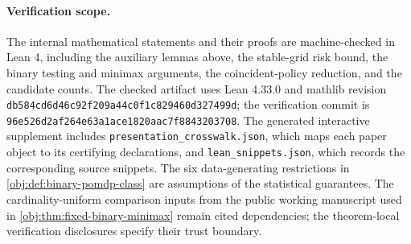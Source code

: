 \paragraph{Verification scope.}
The internal mathematical statements and their proofs are machine-checked in Lean 4, including the auxiliary lemmas above, the stable-grid risk bound, the binary testing and minimax arguments, the coincident-policy reduction, and the candidate counts. The checked artifact uses Lean 4.33.0 and mathlib revision \texttt{db584cd6d46c92f2}\allowbreak\texttt{09a44c0f1c829460d327499d}; the verification commit is \texttt{96e526d2af264e63a1}\allowbreak\texttt{ace1820aac7f8843203708}. The generated interactive supplement includes \texttt{presentation\_crosswalk.json}, which maps each paper object to its certifying declarations, and \texttt{lean\_snippets.json}, which records the corresponding source snippets. The six data-generating restrictions in \cref{obj:def:binary-pomdp-class} are assumptions of the statistical guarantees. The cardinality-uniform comparison inputs from the public working manuscript used in \cref{obj:thm:fixed-binary-minimax} remain cited dependencies; the theorem-local verification disclosures specify their trust boundary.
